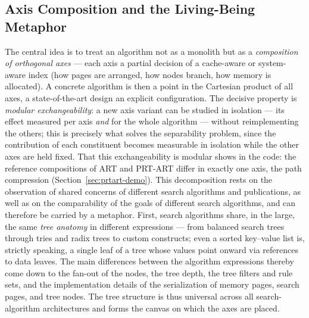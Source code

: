 \begin{nurlang}
\subsection{Axis Composition and the Living-Being Metaphor}\label{sec:anatomy-metaphor}
The central idea is to treat an algorithm not as a monolith but as a \emph{composition of orthogonal
axes} --- each axis a partial decision of a cache-aware or system-aware index (how pages are
arranged, how nodes branch, how memory is allocated). A concrete algorithm is then
a point in the Cartesian product of all axes, a state-of-the-art design an explicit
configuration. The decisive property is \emph{modular exchangeability}: a new axis variant can be
studied in isolation --- its effect measured per axis \emph{and} for the whole algorithm --- without
reimplementing the others; this is precisely what solves the separability problem, since the contribution of each constituent
becomes measurable in isolation while the other axes are held fixed. That this exchangeability is modular shows in the
code: the reference compositions of ART and PRT-ART differ in exactly one axis, the
path compression (Section~\ref{sec:prtart-demo}). This decomposition rests on the observation of shared concerns of different search algorithms and publications, as well as on the comparability of the goals of different search algorithms, and can therefore be carried by a metaphor. First,
search algorithms share, in the large, the same \emph{tree anatomy} in different expressions ---
from balanced search trees through tries and radix trees to custom constructs; even a
sorted key--value list is, strictly speaking, a single leaf of a tree whose values point onward via
references to data leaves. The main differences between the algorithm expressions thereby come down to the fan-out of the nodes, the tree depth, the tree filters and rule sets, and the implementation details of the serialization of memory pages, search pages, and tree nodes. The tree structure is thus universal across all search-algorithm architectures and forms the canvas on which the axes are placed.
\end{nurlang}
